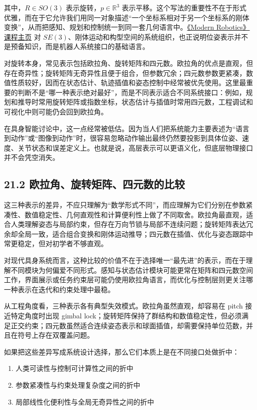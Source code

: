 其中，\(R \in SO(3)\) 表示旋转，\(p \in \mathbb{R}^3\) 表示平移。这个写法的重要性不在于形式优雅，而在于它允许我们用同一对象描述“一个坐标系相对于另一个坐标系的刚体变换”，从而把感知、规划和控制统一到同一套几何语言中。\href{https://modernrobotics.org/}{《Modern Robotics》课程主页} 对 \(SE(3)\)、刚体运动和构型空间的系统组织，也正说明位姿表示并不是预备知识，而是机器人系统接口的基础语言。

对旋转本身，常见表示包括欧拉角、旋转矩阵和四元数。欧拉角的优点是直观，但存在奇异性；旋转矩阵无奇异性且便于组合，但参数冗余；四元数参数更紧凑，数值性质较好，因而在状态估计、轨迹插值和姿态控制中经常被优先使用。这里最重要的判断不是“哪一种表示绝对最好”，而是不同表示适合不同系统接口：例如，规划和推导时常用旋转矩阵或指数坐标，状态估计与插值时常用四元数，工程调试和可视化中则可能仍会回到欧拉角。

在具身智能讨论中，这一点经常被低估。因为当人们把系统能力主要表述为“语言到动作”或“图像到动作”时，很容易忽略动作输出最终仍然要投影到具体位姿、速度、关节状态和误差定义上。也就是说，高层表示可以更语义化，但底层物理接口并不会凭空消失。

\subsection*{21.2 欧拉角、旋转矩阵、四元数的比较}


这三种表示的差异，不应只理解为“数学形式不同”，而应理解为它们分别在参数紧凑性、数值稳定性、几何直观性和计算便利性上做了不同取舍。欧拉角最直观，适合人类理解姿态与局部约束，但存在万向节锁与局部不连续问题；旋转矩阵表达冗余却全局一致，适合组合变换和刚体运动推导；四元数在插值、优化与姿态跟踪中常更稳定，但对初学者不够直观。

对现代具身系统而言，这种比较的价值不在于选择唯一“最先进”的表示，而在于理解不同模块为何偏爱不同形式。感知与状态估计模块可能更常在矩阵和四元数空间工作，界面展示或任务约束层可能仍使用欧拉角语言，而优化与控制层则更关注哪一种表示在迭代和约束处理中最稳。

从工程角度看，三种表示各有典型失效模式。欧拉角虽然直观，却容易在 pitch 接近特定角度时出现 gimbal lock；旋转矩阵保持了群结构和数值稳定性，但必须满足正交约束；四元数虽然适合连续姿态表示和球面插值，却需要保持单位范数，并且在符号上存在双覆盖问题。

如果把这些差异写成系统设计选择，那么它们本质上是在不同接口处做折中：

\begin{enumerate}
\item 人类可读性与控制可计算性之间的折中
\item 参数紧凑性与约束处理复杂度之间的折中
\item 局部线性化便利性与全局无奇异性之间的折中
\end{enumerate}

